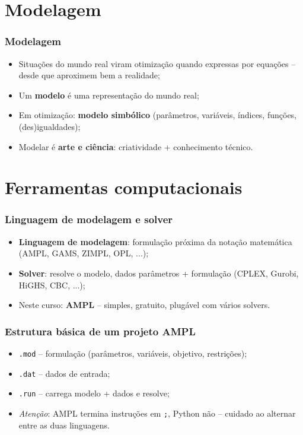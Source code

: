 \documentclass[fleqn]{beamer}
\begin{document}
\section{Modelagem}

\begin{frame}
	\frametitle{Modelagem}
	\begin{itemize}
		\item Situações do mundo real viram otimização quando expressas
			por equações -- desde que aproximem bem a realidade;
		\item Um \textbf{modelo} é uma representação do mundo real;
		\item Em otimização: \textbf{modelo simbólico} (parâmetros,
			variáveis, índices, funções, (des)igualdades);
		\item Modelar é \textbf{arte e ciência}: criatividade +
			conhecimento técnico.
	\end{itemize}
\end{frame}

\section{Ferramentas computacionais}

\begin{frame}
	\frametitle{Linguagem de modelagem e solver}
	\begin{itemize}
		\item \textbf{Linguagem de modelagem}: formulação próxima da
			notação matemática (AMPL, GAMS, ZIMPL, OPL, ...);
		\item \textbf{Solver}: resolve o modelo, dados parâmetros +
			formulação (CPLEX, Gurobi, HiGHS, CBC, ...);
		\item Neste curso: \textbf{AMPL} -- simples, gratuito, plugável
			com vários solvers.
	\end{itemize}
\end{frame}

\begin{frame}
	\frametitle{Estrutura básica de um projeto AMPL}
	\begin{itemize}
		\item \texttt{.mod} -- formulação (parâmetros, variáveis,
			objetivo, restrições);
		\item \texttt{.dat} -- dados de entrada;
		\item \texttt{.run} -- carrega modelo + dados e resolve;
		\item \textit{Atenção}: AMPL termina instruções em \texttt{;},
			Python não -- cuidado ao alternar entre as duas linguagens.
	\end{itemize}
\end{frame}
\end{document}
